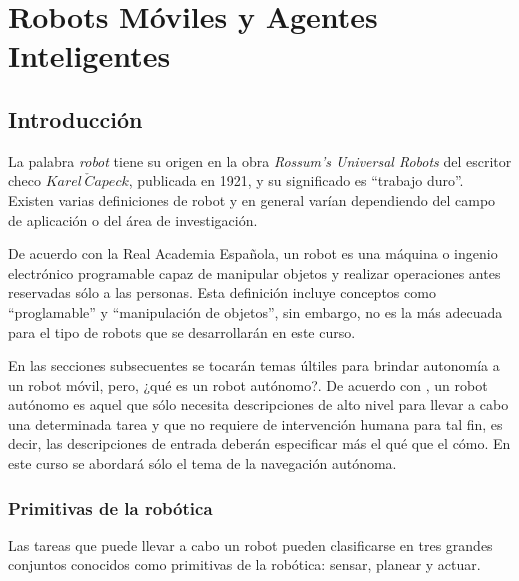 
\chapter{Robots Móviles y Agentes Inteligentes}


\section{Introducción}

La palabra \textit{robot} tiene su origen en la obra \textit{Rossum's Universal Robots} del escritor checo $Karel \,\check{C}apeck$, publicada en 1921, y su significado es ``trabajo duro''. Existen varias definiciones de robot y en general varían dependiendo del campo de aplicación o del área de investigación. 

De acuerdo con la Real Academia Española, un robot es una máquina o ingenio electrónico programable capaz de manipular objetos y realizar operaciones antes reservadas sólo a las personas. Esta definición incluye conceptos como ``proglamable'' y ``manipulación de objetos'', sin embargo, no es la más adecuada para el tipo de robots que se desarrollarán en este curso. 


En las secciones subsecuentes se tocarán temas últiles para brindar autonomía a un robot móvil, pero, ¿qué es un robot autónomo?. De acuerdo con \cite{Latombe1991MotionPlanning}, un robot autónomo es aquel que sólo necesita descripciones de alto nivel para llevar a cabo una determinada tarea y que no requiere de intervención humana para tal fin, es decir, las descripciones de entrada deberán especificar más el qué que el cómo. En este curso se abordará sólo el tema de la navegación autónoma. 

\subsection{Primitivas de la robótica}
Las tareas que puede llevar a cabo un robot pueden clasificarse en tres grandes conjuntos conocidos como primitivas de la robótica: sensar, planear y actuar. 

